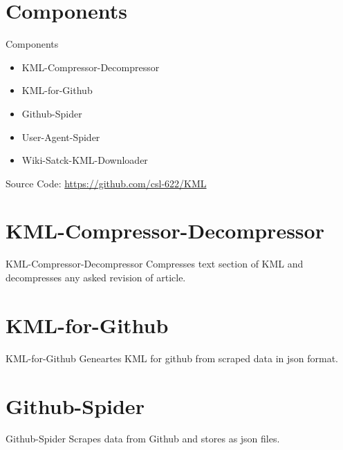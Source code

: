 \documentclass[handout,t]{beamer}
\begin{document}
\section{Components}
\begin{frame}{Components}
  \begin{itemize}
    \item KML-Compressor-Decompressor
    \item KML-for-Github
    \item Github-Spider
    \item User-Agent-Spider
    \item Wiki-Satck-KML-Downloader
  \end{itemize}
\bigskip
Source Code: \url{https://github.com/csl-622/KML}  
  
\end{frame}

\section{KML-Compressor-Decompressor}
\begin{frame}{KML-Compressor-Decompressor}
Compresses text section of KML and decompresses any asked revision of article.
\end{frame}

\section{KML-for-Github}
\begin{frame}{KML-for-Github}
Geneartes KML for github from scraped data in json format.\end{frame}

\section{Github-Spider}
\begin{frame}{Github-Spider}
Scrapes data from Github and stores as json files.
\end{frame}
\end{document}
